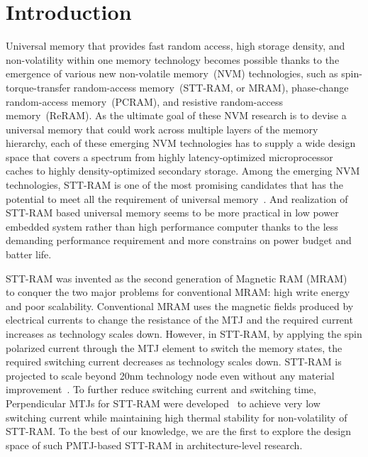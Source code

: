 \section{Introduction} \label{sec:intro}

Universal memory that provides fast random access, high storage density, and non-volatility within one memory technology becomes possible thanks to the emergence of various new non-volatile memory~(NVM) technologies, such as spin-torque-transfer random-access memory~(STT-RAM, or MRAM), phase-change random-access memory~(PCRAM), and resistive random-access memory~(ReRAM). As the ultimate
goal of these NVM research is to devise a universal memory that could work across multiple layers of the memory hierarchy, each of these emerging NVM technologies has to supply a wide design space that covers a spectrum from highly latency-optimized microprocessor caches to highly density-optimized secondary storage. Among the emerging NVM technologies, STT-RAM is one of the most promising candidates that has the potential to meet all the requirement of universal memory~\cite{STTRAM:Review10B,STTRAM:Review10A}. And realization of STT-RAM based universal memory seems to be more practical in low power embedded system rather than high performance computer thanks to the less demanding performance requirement and more constrains on power budget and batter life.

STT-RAM was invented as the second generation of Magnetic RAM (MRAM)~\cite{STTRAM:IEDM05} to conquer the two major problems for conventional MRAM: high write energy and poor scalability. Conventional MRAM uses the magnetic fields produced by electrical currents
to change the resistance of the MTJ and the required current increases as technology scales down. However, in STT-RAM, by applying the spin polarized current through the MTJ element to switch the memory states, the required switching current decreases as technology scales down. STT-RAM is projected to scale beyond 20nm technology node even without any material improvement~\cite{STTRAM:Grandis11}. To further reduce switching current and switching time, Perpendicular MTJs for STT-RAM were developed~\cite{PMTJ:APL06,PMTJ:APL11,PMTJ:Grandis10,PMTJ:Toshiba08,PMTJ:Xiaochun06} to achieve very low switching current while maintaining high thermal stability for non-volatility of STT-RAM. To the best of our knowledge, we are the first to explore the design space of such PMTJ-based STT-RAM in architecture-level research.

